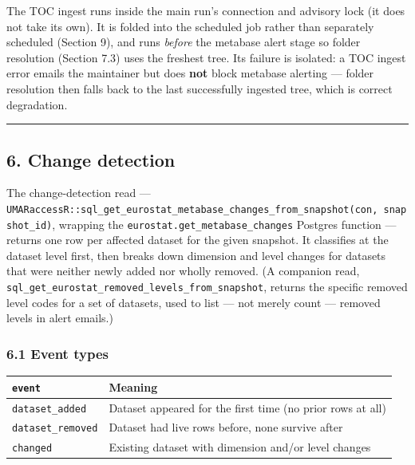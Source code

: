 \documentclass[
]{article}
\newcounter{none} %
\begin{document}
The TOC ingest runs inside the main run's connection and advisory lock
(it does not take its own). It is folded into the scheduled job rather
than separately scheduled (Section 9), and runs \emph{before} the
metabase alert stage so folder resolution (Section 7.3) uses the
freshest tree. Its failure is isolated: a TOC ingest error emails the
maintainer but does \textbf{not} block metabase alerting --- folder
resolution then falls back to the last successfully ingested tree, which
is correct degradation.

\begin{center}\rule{0.5\linewidth}{0.5pt}\end{center}

\subsection{6. Change detection}\label{change-detection}

The change-detection read ---
\texttt{UMARaccessR::sql\_get\_eurostat\_metabase\_changes\_from\_snapshot(con,\ snapshot\_id)},
wrapping the \texttt{eurostat.get\_metabase\_changes} Postgres function
--- returns one row per affected dataset for the given snapshot. It
classifies at the dataset level first, then breaks down dimension and
level changes for datasets that were neither newly added nor wholly
removed. (A companion read,
\texttt{sql\_get\_eurostat\_removed\_levels\_from\_snapshot}, returns
the specific removed level codes for a set of datasets, used to list ---
not merely count --- removed levels in alert emails.)

\subsubsection{6.1 Event types}\label{event-types}

{\def\LTcaptype{none} %
\begin{longtable}[]{@{}
  >{\raggedright\arraybackslash}p{}
  >{\raggedright\arraybackslash}p{}@{}}
\toprule\noalign{}
\begin{minipage}[b]{\linewidth}\raggedright
\texttt{event}
\end{minipage} & \begin{minipage}[b]{\linewidth}\raggedright
Meaning
\end{minipage} \\
\midrule\noalign{}
\endhead
\bottomrule\noalign{}
\endlastfoot
\texttt{dataset\_added} & Dataset appeared for the first time (no prior
rows at all) \\
\texttt{dataset\_removed} & Dataset had live rows before, none survive
after \\
\texttt{changed} & Existing dataset with dimension and/or level
changes \\
\end{longtable}
}
\end{document}
